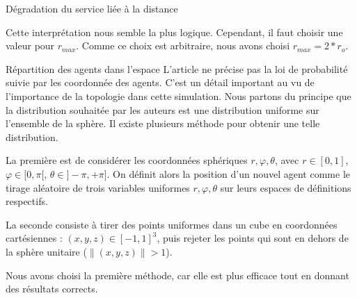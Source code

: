 \documentclass{article}
\begin{document}
\begin{hypothese}{Dégradation du service liée à la distance}
\begin{center}
\end{center}

Cette interprétation nous semble la plus logique. Cependant, il faut choisir une valeur pour $r_{max}$. Comme ce choix est arbitraire, nous avons choisi $r_{max} = 2 * r_o$.\newline


\end{hypothese}

\begin{hypothese}{Répartition des agents dans l'espace}
L'article ne précise pas la loi de probabilité suivie par les coordonnée des agents. C'est un détail important au vu de l'importance de la topologie dans cette simulation. Nous partons du principe que la distribution souhaitée par les auteurs est une distribution uniforme sur l'ensemble de la sphère. Il existe plusieurs méthode pour obtenir une telle distribution.\newline

La première est de considérer les coordonnées sphériques $r, \varphi, \theta$, avec $r \in [0, 1]$, $\varphi \in [0, \pi[$, $\theta \in ]-\pi, +\pi]$. On définit alors la position d'un nouvel agent comme le tirage aléatoire de trois variables uniformes $r, \varphi, \theta$ sur leurs espaces de définitions respectifs.\newline

La seconde consiste à tirer des points uniformes dans un cube en coordonnées cartésiennes : $(x, y, z) \in [-1, 1]^3$, puis rejeter les points qui sont en dehors de la sphère unitaire ($\|(x, y, z)\| > 1$).\newline

Nous avons choisi la première méthode, car elle est plus efficace tout en donnant des résultats corrects.
\end{hypothese}
\vspace{10pt}
\end{document}
